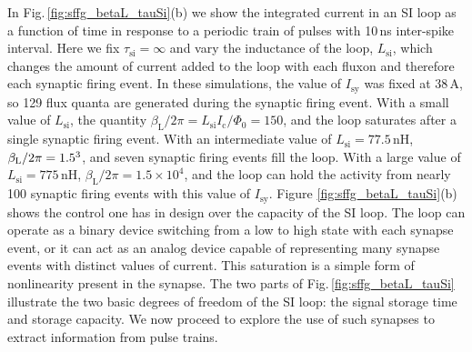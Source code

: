 \documentclass[twocolumn]{article}
\begin{document}
In Fig.\,\ref{fig:sffg_betaL_tauSi}(b) we show the integrated current in an SI loop as a function of time in response to a periodic train of pulses with 10\,ns inter-spike interval. Here we fix $\tau_{\mathrm{si}} = \infty$ and vary the inductance of the loop, $L_{\mathrm{si}}$, which changes the amount of current added to the loop with each fluxon and therefore each synaptic firing event. In these simulations, the value of $I_{\mathrm{sy}}$ was fixed at 38\,\textmu A, so 129 flux quanta are generated during the synaptic firing event. With a small value of $L_{\mathrm{si}}$, the quantity $\beta_{\mathrm{L}}/2\pi = L_{\mathrm{si}} I_{\mathrm{c}}/\Phi_0 =  150$, and the loop saturates after a single synaptic firing event. With an intermediate value of $L_{\mathrm{si}} = 77.5$\,nH, $\beta_{\mathrm{L}}/2\pi = 1.5\time 10^3$, and seven synaptic firing events fill the loop. With a large value of $L_{\mathrm{si}} = 775$\,nH, $\beta_{\mathrm{L}}/2\pi = 1.5\times 10^{4}$, and the loop can hold the activity from nearly 100 synaptic firing events with this value of $I_{\mathrm{sy}}$. Figure \ref{fig:sffg_betaL_tauSi}(b) shows the control one has in design over the capacity of the SI loop. The loop can operate as a binary device switching from a low to high state with each synapse event, or it can act as an analog device capable of representing many synapse events with distinct values of current. This saturation is a simple form of nonlinearity present in the synapse. The two parts of Fig.\,\ref{fig:sffg_betaL_tauSi} illustrate the two basic degrees of freedom of the SI loop: the signal storage time and storage capacity. We now proceed to explore the use of such synapses to extract information from pulse trains.
\end{document}
